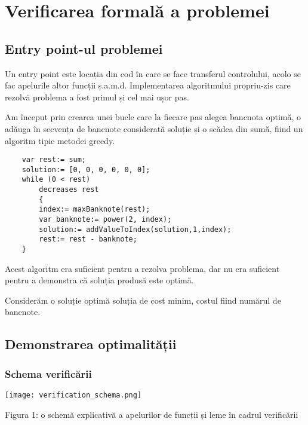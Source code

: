 

\chapter{Verificarea formală a problemei}

\section{Entry point-ul problemei}
    Un entry point este locația din cod în care se face transferul controlului, acolo se fac apelurile altor funcții ș.a.m.d.
    Implementarea algoritmului propriu-zis care rezolvă problema a fost primul și cel mai ușor pas.\par
    Am început prin crearea unei bucle care la fiecare pas alegea bancnota optimă, o adăuga în secvența de 
    bancnote considerată soluție și o scădea din sumă, fiind un algoritm tipic metodei greedy.
    \begin{lstlisting}
    var rest:= sum;
    solution:= [0, 0, 0, 0, 0, 0];
    while (0 < rest)
        decreases rest 
        {
        index:= maxBanknote(rest);
        var banknote:= power(2, index);
        solution:= addValueToIndex(solution,1,index);
        rest:= rest - banknote;
    }
    \end{lstlisting}

    Acest algoritm era suficient pentru a rezolva problema, dar nu era suficient pentru a demonstra că soluția produsă este optimă.\par
    Considerăm o soluție optimă soluția de cost minim, costul fiind numărul de bancnote.
    
\section{Demonstrarea optimalității}
    \subsection{Schema verificării}
    \vspace{1cm}
    \begin{center}
        \texttt{[image: verification\_schema.png]}\par
        \caption{Figura 1: o schemă explicativă a apelurilor de funcții și leme în cadrul verificării}
    \end{center}
   
